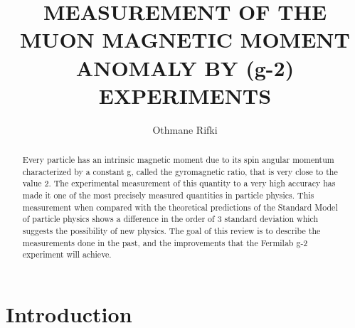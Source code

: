 \documentclass{outhesis}
\begin{document}
\author{Othmane Rifki}
\title{MEASUREMENT OF THE MUON MAGNETIC MOMENT ANOMALY BY ({g}-2) EXPERIMENTS}
\address{Norman, Oklahoma}


%  


\begin{abstract}
Every particle has an intrinsic magnetic moment due to its spin angular momentum characterized by a constant g, called the gyromagnetic ratio, that is very close to the value 2. The experimental measurement of this quantity to a very high accuracy has made it one of the most precisely measured quantities in particle physics. This measurement when compared with the theoretical predictions of the Standard Model of particle physics shows a difference in the order of 3 standard deviation which suggests the possibility of new physics. The goal of this review is to describe the measurements done in the past, and the improvements that the Fermilab g-2 experiment will achieve.

\end{abstract}


\frontmatter

\maketitle

\mainmatter

\section{Introduction}
\end{document}
